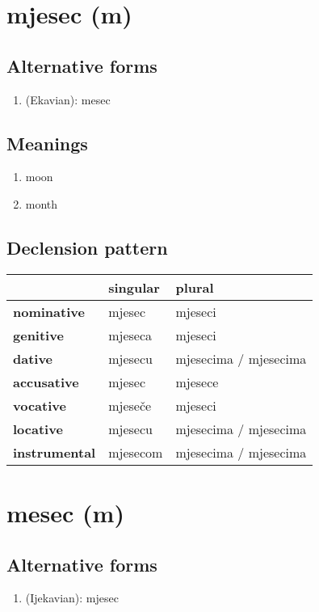 \filbreak
\section{mjesec (m)}
\subsection*{Alternative forms}
\begin{enumerate}
\item (Ekavian): mesec
\end{enumerate}
\subsection*{Meanings}
\begin{enumerate}
\item moon
\item month
\end{enumerate}
\subsection*{Declension pattern}
\begin{tabularx}{\linewidth}{Xll}
\toprule
{} &  singular &                 plural \\
\midrule
\textbf{nominative  } &    mjesec &                mjeseci \\
\textbf{genitive    } &   mjeseca &                mjeseci \\
\textbf{dative      } &   mjesecu &  mjesecima / mjesecima \\
\textbf{accusative  } &    mjesec &                mjesece \\
\textbf{vocative    } &   mjeseče &                mjeseci \\
\textbf{locative    } &   mjesecu &  mjesecima / mjesecima \\
\textbf{instrumental} &  mjesecom &  mjesecima / mjesecima \\
\bottomrule
\end{tabularx}

\filbreak
\section{mesec (m)}
\subsection*{Alternative forms}
\begin{enumerate}
\item (Ijekavian): mjesec
\end{enumerate}
